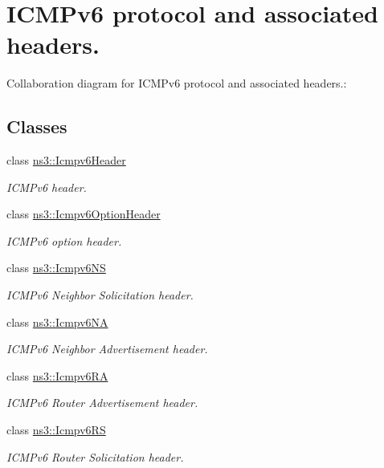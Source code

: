 \hypertarget{group__icmpv6}{}\section{I\+C\+M\+Pv6 protocol and associated headers.}
\label{group__icmpv6}
Collaboration diagram for I\+C\+M\+Pv6 protocol and associated headers.\+:
\subsection*{Classes}
\begin{DoxyCompactItemize}
\item 
class \hyperlink{classns3_1_1Icmpv6Header}{ns3\+::\+Icmpv6\+Header}
\begin{DoxyCompactList}\small\item\em I\+C\+M\+Pv6 header. \end{DoxyCompactList}\item 
class \hyperlink{classns3_1_1Icmpv6OptionHeader}{ns3\+::\+Icmpv6\+Option\+Header}
\begin{DoxyCompactList}\small\item\em I\+C\+M\+Pv6 option header. \end{DoxyCompactList}\item 
class \hyperlink{classns3_1_1Icmpv6NS}{ns3\+::\+Icmpv6\+NS}
\begin{DoxyCompactList}\small\item\em I\+C\+M\+Pv6 Neighbor Solicitation header. \end{DoxyCompactList}\item 
class \hyperlink{classns3_1_1Icmpv6NA}{ns3\+::\+Icmpv6\+NA}
\begin{DoxyCompactList}\small\item\em I\+C\+M\+Pv6 Neighbor Advertisement header. \end{DoxyCompactList}\item 
class \hyperlink{classns3_1_1Icmpv6RA}{ns3\+::\+Icmpv6\+RA}
\begin{DoxyCompactList}\small\item\em I\+C\+M\+Pv6 Router Advertisement header. \end{DoxyCompactList}\item 
class \hyperlink{classns3_1_1Icmpv6RS}{ns3\+::\+Icmpv6\+RS}
\begin{DoxyCompactList}\small\item\em I\+C\+M\+Pv6 Router Solicitation header. \end{DoxyCompactList}\item 

\end{DoxyCompactItemize}
